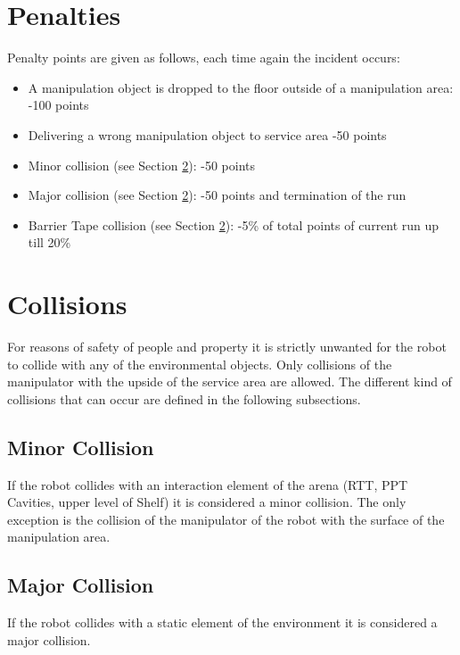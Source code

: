 \section{Penalties}
\label{sec:penalties}
Penalty points are given as follows, each time again the incident occurs:

\begin{itemize}
	\item A manipulation object is dropped to the floor outside of a manipulation area: \hfill -100 points
	\item Delivering a wrong manipulation object to service area \hfill -50 points
	\item Minor collision (see Section \ref{sec:Collisions}): \hfill -50 points
	\item Major collision (see Section \ref{sec:Collisions}): \hfill -50 points and termination of the run
  \item Barrier Tape collision (see Section \ref{sec:Collisions}): \hfill -5\% of total points of current run up till
  20\%
\end{itemize}

\section{Collisions}\label{sec:Collisions}

For reasons of safety of people and property it is strictly unwanted for the robot to collide with any of the
environmental objects. Only collisions of the manipulator with the upside of the service area are allowed. The
different kind of collisions that can occur are defined in the following subsections.

\subsection{Minor Collision}

If the robot collides with an interaction element of the arena (RTT, PPT Cavities, upper level of Shelf) it is
considered a minor collision. The only exception is the collision of the manipulator of the robot with the surface of
the manipulation area.

\subsection{Major Collision}

If the robot collides with a static element of the environment it is considered a major collision.

